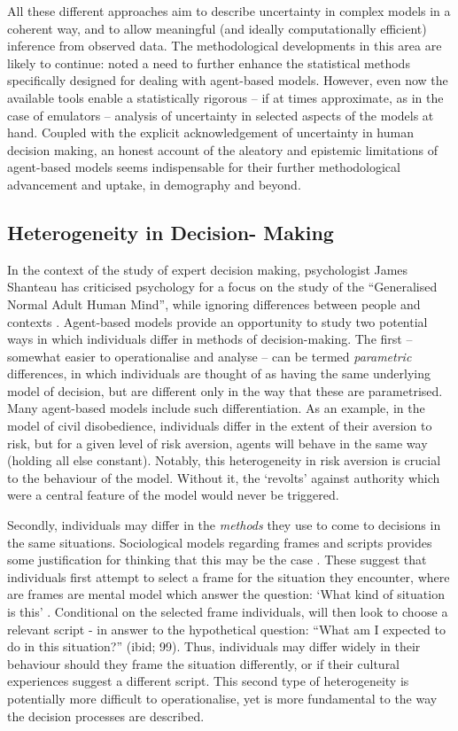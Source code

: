 \documentclass{article}
\begin{document}
All these different approaches aim to describe uncertainty in complex models in a coherent way, and to allow meaningful (and ideally computationally efficient) inference from observed data. The methodological developments in this area are likely to continue: \citet{Heard2015} noted a need to further enhance the statistical methods specifically designed for dealing with agent-based models. However, even now the available tools enable a statistically rigorous -- if at times approximate, as in the case of emulators -- analysis of uncertainty in selected aspects of the models at hand. Coupled with the explicit acknowledgement of uncertainty in human decision making, an honest account of the aleatory and epistemic limitations of agent-based models seems indispensable for their further methodological advancement and uptake, in demography and beyond.

\subsection{Heterogeneity in Decision-
Making}\label{heterogeneity-in-decision-strategies}

In the context of the study of expert decision making, psychologist James Shanteau has criticised psychology for a focus on the study of the ``Generalised Normal Adult Human Mind'', while ignoring differences between people and contexts \citep{Shanteau2015}. Agent-based models provide an opportunity to study two potential ways in which individuals differ in methods of decision-making. The first -- somewhat easier to operationalise and analyse -- can be termed \emph{parametric} differences, in which individuals are thought of as having the same underlying model of decision, but are different only in the way that these are parametrised. Many agent-based models include such differentiation. As an example, in the \citet{Epstein2002} model of civil disobedience, individuals differ in the extent of their aversion to risk, but for a given level of risk aversion, agents will behave in the same way (holding all else constant). Notably, this heterogeneity in risk aversion is crucial to the behaviour of the model. Without it, the `revolts' against authority which were a central feature of the model would never be triggered.

Secondly, individuals may differ in the \emph{methods} they use to come to decisions in the same situations. Sociological models regarding frames and scripts provides some justification for thinking that this may be the case \citep{Kronenberg2014}. These suggest that individuals first attempt to select a frame for the situation they encounter, where are frames are mental model which answer the question: `What kind of situation is this' . Conditional on the selected frame individuals, will then look to choose a relevant script - in answer to the hypothetical question: ``What am I expected to do in this situation?'' (ibid; 99). Thus, individuals may differ widely in their behaviour should they frame the situation differently, or if their cultural experiences suggest a different script.  This second type of heterogeneity is potentially more difficult to operationalise, yet is more fundamental to the way the decision processes are described.
\end{document}
